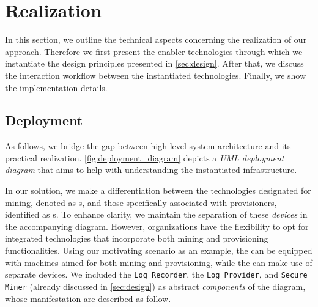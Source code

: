 \section{Realization}
\label{sec:realization}
In this section, we outline the technical aspects concerning the realization of our approach. Therefore we first present the enabler technologies through which we instantiate the design principles presented in \cref{sec:design}. After that, we discuss the interaction workflow between the instantiated technologies. Finally, we show the implementation details.

\subsection{Deployment}
As follows, we bridge the gap between high-level system architecture and its practical realization. \cref{fig:deployment_diagram} depicts a \textit{UML deployment diagram} \cite{koch2002expressive} that aims to help with understanding the instantiated infrastructure. 

In our solution, we make a differentiation between the technologies designated for mining, denoted as s, and those specifically associated with provisioners, identified as s. To enhance clarity, we maintain the separation of these \textit{devices} in the accompanying diagram. However, organizations have the flexibility to opt for integrated technologies that incorporate both mining and provisioning functionalities. Using our motivating scenario as an example, the  can be equipped with machines aimed for both mining and provisioning, while the  can make use of separate devices. We included the \texttt{Log Recorder}, the \texttt{Log Provider}, and \texttt{Secure Miner} (already discussed in \cref{sec:design}) as abstract \textit{components} of the diagram, whose manifestation are described as follow. 

